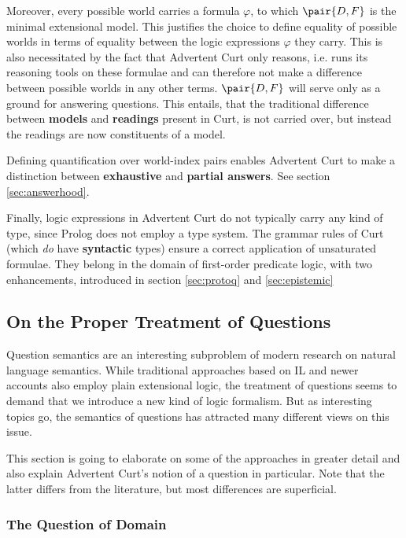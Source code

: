 \documentclass[a4paper]{article}
\newcommand{\abbr}{\textsf} %
\newcommand{\stress}{\textbf} %
\newcommand{\term}[1]{\textsf{\textbf{#1}}} %
\newcommand{\pn}{\textsf} %
\newcommand{\curt}{\pn{Curt}}
\newcommand{\acurt}{\pn{Advertent Curt}}
\newcommand{\prol}{\pn{Prolog}}
\theoremstyle{remark}
\theoremstyle{remark}
\theoremstyle{definition}
\theoremstyle{definition}
\begin{document}
Moreover, every possible world carries a formula $\varphi$, to which $\pair{D,F}$
is the minimal extensional model. This justifies the choice to define equality
of possible worlds in terms of equality between the logic expressions $\varphi$
they carry. This is also necessitated by the fact that \acurt{}  only reasons,
i.e. runs its reasoning tools on these formulae and can therefore not make a
difference between possible worlds in any other terms. $\pair{D,F}$ will serve
only as a ground for answering questions. This entails, that the traditional
difference between \term{models} and \term{readings} present in \curt, is not
carried over, but instead the readings are now constituents of a model.

Defining quantification over world-index pairs enables \acurt{} to make a
distinction between \term{exhaustive} and \term{partial answers}. See section
\ref{sec:answerhood}.

Finally, logic expressions in \acurt{} do not typically carry any kind of type,
since \prol{} does not employ a type system. The grammar rules of \curt{} (which
\emph{do} have \stress{syntactic} types) ensure a correct application of
unsaturated formulae. They belong in the domain of first-order predicate logic,
with two enhancements, introduced in section \ref{sec:protoq} and \ref{sec:epistemic}

\subsection{On the Proper Treatment of Questions}

Question semantics are an interesting subproblem of modern research on natural
language semantics. While traditional approaches based on \abbr{IL} and newer
accounts also employ plain extensional logic, %
the treatment
of questions seems to demand that we introduce a new kind of logic formalism.
But as interesting topics go, the semantics of questions has attracted many
different views on this issue.

This section is going to elaborate on some of the approaches in greater detail
and also explain \acurt's notion of a question in particular. Note that the
latter differs from the literature, but most differences are superficial.

\subsubsection{The Question of Domain}
\end{document}
